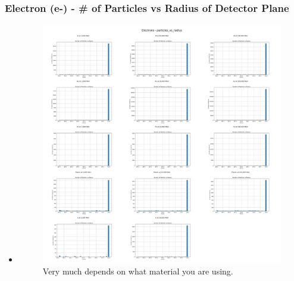 \documentclass[aspectratio-169]{beamer}
\begin{document}
\begin{frame}
\frametitle{Electron (e-) - \# of Particles vs Radius of Detector Plane}
\begin{itemize}
    \item 
    \begin{minipage}{0.5\textwidth}
        \begin{figure}
            \centering
            \includegraphics[width=\textwidth]{Combined Plots/particles_vs_radius_e-.png}
            \footnotesize{Very much depends on what material you are using.}
        \end{figure}
    \end{minipage}
\end{itemize}
\end{frame}

\end{document}
